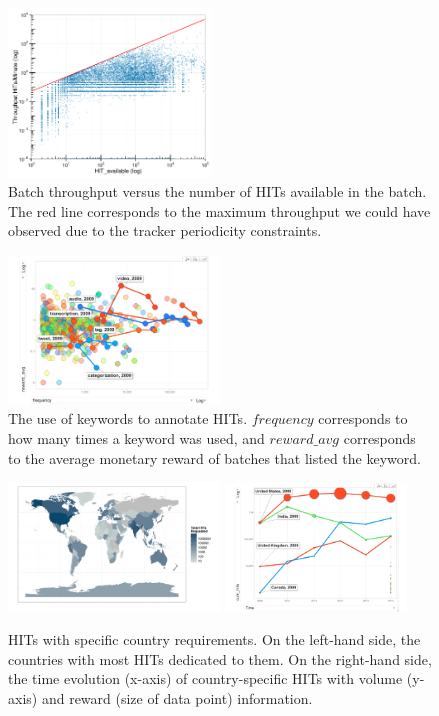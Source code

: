 \begin{figure}[tb]
	\centering
		\includegraphics[width=0.48\textwidth]{figures/motiv_mturk}
	\caption{Batch throughput versus the number of HITs available in the batch. The red line corresponds to the maximum throughput we could have observed due to the tracker periodicity constraints.\protect\footnotemark}
	\label{fig:motiv}
\end{figure}
\begin{figure}[tb]
	\centering
		\includegraphics[width=0.5\textwidth]{figures/tagEvolution}
	\caption{The use of keywords to annotate HITs. $frequency$ corresponds to how many times a keyword was used, and $reward\_avg$ corresponds to the average monetary reward of batches that listed the keyword.}
	\label{fig:tagEvolution}
\end{figure}
\begin{figure}[tb]
	\centering
		\includegraphics[width=0.5\textwidth]{figures/map}
		\includegraphics[width=0.43\textwidth]{figures/countriesTime}
	\caption{HITs with specific country requirements. On the left-hand side, the countries with most HITs dedicated to them. On the right-hand side, the time evolution (x-axis) of country-specific HITs with volume (y-axis) and reward (size of data point) information.}
	\label{fig:country}
\end{figure}

